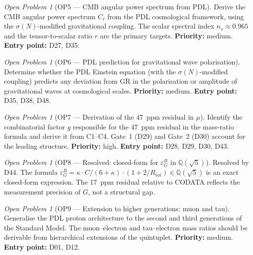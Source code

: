 \documentclass[11pt,a4paper]{article}
\theoremstyle{plain}
\theoremstyle{definition}
\theoremstyle{remark}
\newtheorem{openproblem}[theorem]{Open Problem}
\newcommand{\Rtot}{R_{\mathrm{tot}}}
\newcommand{\sigmaN}{\sigma(N)}
\newcommand{\epsGeomB}{\varepsilon_G^B}
\begin{document}
\begin{openproblem}[OP5 --- CMB angular power spectrum from PDL]
\label{op:CMBspectrum}
Derive the CMB angular power spectrum $C_\ell$ from the PDL cosmological framework, using the $\sigmaN$-modified gravitational coupling. The scalar spectral index $n_s \approx 0.965$ and the tensor-to-scalar ratio $r$ are the primary targets. \textbf{Priority:} medium. \textbf{Entry point:} D27, D35.
\end{openproblem}

\begin{openproblem}[OP6 --- PDL prediction for gravitational wave polarisation]
\label{op:GW}
Determine whether the PDL Einstein equation (with the $\sigmaN$-modified coupling) predicts any deviation from GR in the polarisation or amplitude of gravitational waves at cosmological scales. \textbf{Priority:} medium. \textbf{Entry point:} D35, D38, D48.
\end{openproblem}

\begin{openproblem}[OP7 --- Derivation of the 47~ppm residual in $\mu$]
\label{op:residual}
Identify the combinatorial factor $g$ responsible for the 47~ppm residual in the mass-ratio formula and derive it from C1--C4. Gate~1 (D29) and Gate~2 (D30) account for the leading structure. \textbf{Priority:} high. \textbf{Entry point:} D28, D29, D30, D43.
\end{openproblem}

\begin{openproblem}[OP8 --- Resolved: closed-form for $\epsGeomB$ in $\mathbb{Q}(\sqrt{5})$]
\label{op:epsGeomB}
\textcolor{proofblue}{Resolved by D44.} The formula $\epsGeomB = \kappa \cdot C/(6+\kappa)\cdot(1+2/\Rtot) \in \mathbb{Q}(\sqrt{5})$ is an exact closed-form expression. The 17~ppm residual relative to CODATA reflects the measurement precision of $G$, not a structural gap.
\end{openproblem}

\begin{openproblem}[OP9 --- Extension to higher generations: muon and tau]
\label{op:generations}
Generalise the PDL proton architecture to the second and third generations of the Standard Model. The muon--electron and tau--electron mass ratios should be derivable from hierarchical extensions of the quintuplet. \textbf{Priority:} medium. \textbf{Entry point:} D01, D12.
\end{openproblem}
\end{document}
